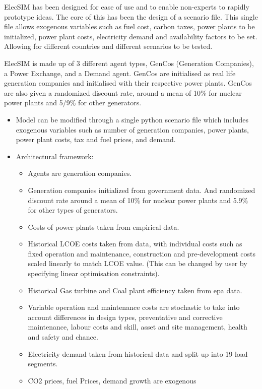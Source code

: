 
ElecSIM has been designed for ease of use and to enable non-experts to rapidly prototype ideas. The core of this has been the design of a scenario file. This single file allows exogenous variables such as fuel cost, carbon taxes, power plants to be initialized, power plant costs, electricity demand and availability factors to be set. Allowing for different countries and different scenarios to be tested.

ElecSIM is made up of 3 different agent types, GenCos (Generation Companies), a Power Exchange, and a Demand agent. GenCos are initialised as real life generation companies and initialised with their respective power plants. GenCos are also given a randomized discount rate, around a mean of 10\% for nuclear power plants and 5/9\% for other generators.


\begin{itemize}
	\item Model can be modified through a single python scenario file which includes exogenous variables such as number of generation companies, power plants, power plant costs, tax and fuel prices, and demand.
	\item Architectural framework:
	\begin{itemize}
		\item Agents are generation companies.
		\item Generation companies initialized from government data. And randomized discount rate around a mean of 10\% for nuclear power plants and 5.9\% for other types of generators.
		\item Costs of power plants taken from empirical data. 
		\item Historical LCOE costs taken from data, with individual costs such as fixed operation and maintenance, construction and pre-development costs scaled linearly to match LCOE value. (This can be changed by user by specifying linear optimisation constraints).
		\item Historical Gas turbine and Coal plant efficiency taken from epa data.
		\item Variable operation and maintenance costs are stochastic to take into account differences in design types, preventative and corrective maintenance, labour costs and skill, asset and site management, health and safety and chance.
		\item Electricity demand taken from historical data and split up into 19 load segments.
		\item CO2 prices, fuel Prices, demand growth are exogenous

\end{itemize}
\end{itemize}
